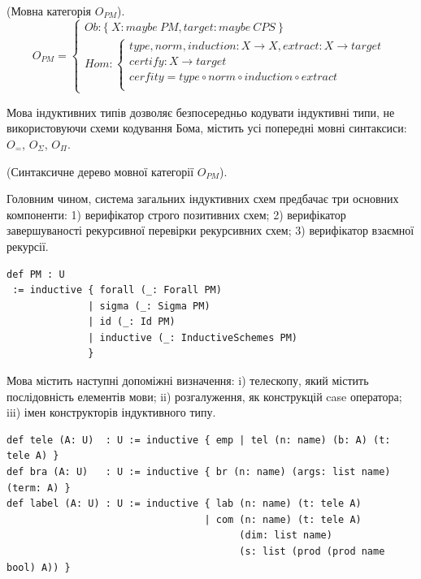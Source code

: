 \begin{definition} (Мовна категорія $O_{PM}$).
\begin{equation}
O_{PM} =
\begin{cases}
Ob: \{\ X: maybe\ PM, target: maybe\ CPS\ \} \\
Hom: \begin{cases}
type,norm,induction: X \rightarrow X, extract: X \rightarrow target \\
certify : X \rightarrow target \\
cerfity = type \circ norm \circ induction \circ extract \\
\end{cases}
\end{cases}
\end{equation}
\end{definition}

Мова індуктивних типів дозволяє безпосередньо кодувати індуктивні типи,
не використовуючи схеми кодування Бома, містить усі попередні мовні синтаксиси:
$O_=$, $O_\Sigma$, $O_\Pi$.

\begin{definition} (Синтаксичне дерево мовної категорії $O_{PM}$).

Головним чином, система загальних індуктивних схем предбачає три основних компоненти:
1) верифікатор строго позитивних схем;
2) верифікатор завершуваності рекурсивної перевірки рекурсивних схем;
3) верифікатор взаємної рекурсії.

\begin{lstlisting}
def PM : U
 := inductive { forall (_: Forall PM)
              | sigma (_: Sigma PM)
              | id (_: Id PM)
              | inductive (_: InductiveSchemes PM)
              }
\end{lstlisting}
\end{definition}

Мова містить наступні допоміжні визначення: i) телескопу,
який містить послідовність елементів мови; ii) розгалуження,
як конструкцій case оператора; iii) імен конструкторів індуктивного типу.

\begin{lstlisting}
def tele (A: U)  : U := inductive { emp | tel (n: name) (b: A) (t: tele A) }
def bra (A: U)   : U := inductive { br (n: name) (args: list name) (term: A) }
def label (A: U) : U := inductive { lab (n: name) (t: tele A)
                                  | com (n: name) (t: tele A)
                                        (dim: list name)
                                        (s: list (prod (prod name bool) A)) }
\end{lstlisting}

